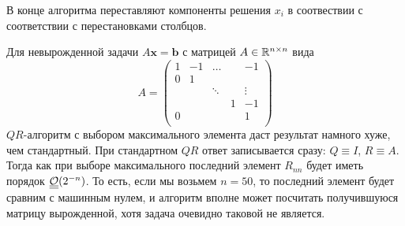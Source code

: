 В конце алгоритма переставляют компоненты решения $x_i$ в соотвествии
с соответствии с перестановками столбцов.

\begin{remark}
  Для невырожденной задачи $A\mathbf{x}=\mathbf{b}$ с матрицей $A\in\mathbb{R}^{n\times n}$ вида
  \[A=\left(\begin{array}{ccccc}
        1 & -1 & \ldots &   & -1     \\
        0 & 1  &        &   &        \\
          &    & \ddots &   & \vdots \\
          &    &        & 1 & -1     \\
        0 &    &        &   & 1      \\
      \end{array}\right)\]
  $QR$-алгоритм с выбором максимального элемента даст результат
  намного хуже, чем стандартный. При стандартном $QR$ ответ
  записывается сразу: $Q\equiv I$, $R\equiv A$.
  Тогда как при выборе максимального последний элемент $R_{nn}$
  будет иметь порядок $\underline{\underline{\mathcal{O}}}(2^{-n})$. То есть, если мы возьмем $n=50$,
  то последний элемент будет сравним с машинным нулем, и алгоритм
  вполне может посчитать получившуюся матрицу вырожденной,
  хотя задача очевидно таковой не является.
\end{remark}

